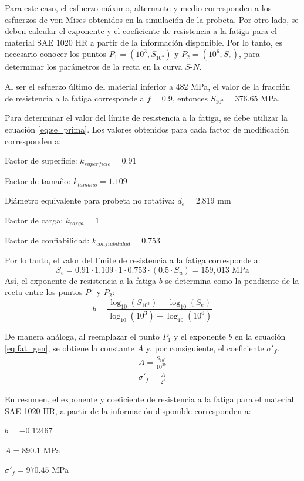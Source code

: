 Para este caso, el esfuerzo máximo, alternante y medio corresponden a los esfuerzos de von Mises obtenidos en la simulación de la probeta. Por otro lado, se deben calcular el exponente y el coeficiente de resistencia a la fatiga para el material SAE 1020 HR a partir de la información disponible. Por lo tanto, es necesario conocer los puntos $P_1 = (10^3,S_{10^3})$ y $P_2 = (10^6,S_e)$, para determinar los parámetros de la recta en la curva $S$-$N$.

Al ser el esfuerzo último del material inferior a 482 MPa, el valor de la fracción de resistencia a la fatiga corresponde a $f = 0.9$, entonces $S_{10^3} = 376.65$ MPa.

Para determinar el valor del límite de resistencia a la fatiga, se debe utilizar la ecuación \ref{eq:se_prima}. Los valores obtenidos para cada factor de modificación corresponden a:
\begin{itemize*}
	\item Factor de superficie: $k_{superficie} = 0.91$
	\item Factor de tamaño: $k_{tama\tilde{n}o} = 1.109$
	\begin{itemize*}
		\item Diámetro equivalente para probeta no rotativa: $d_e = 2.819$ mm
	\end{itemize*}
	\item Factor de carga: $k_{carga} = 1$
	\item Factor de confiabilidad: $k_{confiabilidad} = 0.753$
\end{itemize*} 

\newpage

Por lo tanto, el valor del límite de resistencia a la fatiga corresponde a:
\begin{equation}
	S_e = 0.91 \cdot 1.109 \cdot 1 \cdot 0.753 \cdot (0.5 \cdot S_u) = 159,013 \text{ MPa}
\end{equation}
Así, el exponente de resistencia a la fatiga $b$ se determina como la pendiente de la recta entre los puntos $P_1$ y $P_2$:
\begin{equation}
	b = \frac{\log_{10} (S_{10^3}) - \log_{10} (S_e)}{\log_{10} (10^3) - \log_{10} (10^6)}
\end{equation}

De manera análoga, al reemplazar el punto $P_1$ y el exponente $b$ en la ecuación \ref{eq:fat_gen}, se obtiene la constante $A$ y, por consiguiente, el coeficiente $\sigma'_f$.
\begin{gather}
	A = \frac{S_{10^3}}{10^{3b}} \\
	\sigma'_f = \frac{A}{2^b}
\end{gather}

En resumen, el exponente y coeficiente de resistencia a la fatiga para el material SAE 1020 HR, a partir de la información disponible corresponden a:
\begin{itemize*}
	\item $b = -0.12467$ 
	\item $A = 890.1$ MPa
	\item $\sigma'_f = 970.45$ MPa
\end{itemize*}
